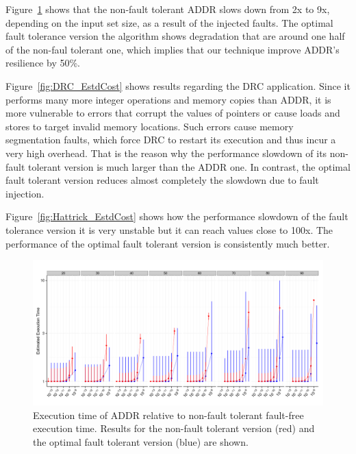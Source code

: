 \documentclass{sig-alternate}
\begin{document}
Figure~\ref{fig:Lasso_EstdCost} shows that the non-fault tolerant ADDR slows down from 2x to 9x, depending on the input set size, as a result of the injected faults.
The optimal fault tolerance version the algorithm shows degradation that are around one half of the non-faul tolerant one, which implies that our technique improve ADDR's resilience by 50\%. 

Figure~\ref{fig:DRC_EstdCost} shows results regarding the DRC application. 
Since it performs many more integer operations and memory copies than ADDR, it is more vulnerable to errors that corrupt the values of pointers or cause loads and stores to target invalid memory locations.
Such errors cause memory segmentation faults, which force DRC to restart its execution and thus incur a very high overhead. 
That is the reason why the performance slowdown of its non-fault tolerant version is much larger than the ADDR one. 
In contrast, the optimal fault tolerant version reduces almost completely the slowdown due to fault injection.   

Figure~\ref{fig:Hattrick_EstdCost} shows how the performance slowdown of the fault tolerance version it is very unstable but it can reach values close to 100x. 
The performance of the optimal fault tolerant version is consistently much better.     

\begin{figure}[ht!]
\centering
\includegraphics[width=2.00\columnwidth]{figs/Lasso_EstdCost.png}
\vspace{-10pt}
\caption{Execution time of ADDR relative to non-fault tolerant fault-free execution time. Results for the non-fault tolerant version (red) and the optimal fault tolerant version (blue) are shown.}
\vspace{-10pt}
\label{fig:Lasso_EstdCost}
\end{figure}
\end{document}
